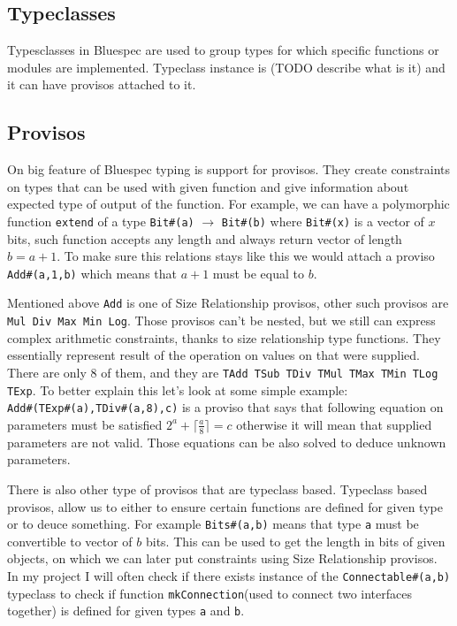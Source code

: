 \documentclass[14pt]{report}
\begin{document}
\subsection{Typeclasses}
\label{sec:Typeclasses}
Typesclasses in Bluespec are used to group types for which specific functions or modules are implemented. Typeclass instance is (TODO describe what is it) and it can have provisos attached to it.

\subsection{Provisos}
\label{sec:Provisos}
On big feature of Bluespec typing is support for provisos. They create constraints on types that can be used with given function and give information about expected type of output of the function. For example, we can have a polymorphic function \verb!extend! of a type \verb!Bit#(a)! $\rightarrow$ \verb!Bit#(b)! where \verb!Bit#(x)! is a vector of $x$ bits, such function accepts any length and always return vector of length $b=a+1$. To make sure this relations stays like this we would attach a proviso \verb!Add#(a,1,b)! which means that $a+1$ must be equal to $b$. 
\par
Mentioned above \verb!Add! is one of Size Relationship provisos, other such provisos are \verb!Mul Div Max Min Log!.
Those provisos can't be nested, but we still can express complex arithmetic constraints, thanks to size relationship type functions.
They essentially represent result of the operation on values on that were supplied. There are only 8 of them, and they are \verb!TAdd TSub TDiv TMul TMax TMin TLog TExp!.
To better explain this let's look at some simple example: \\
\verb!Add#(TExp#(a),TDiv#(a,8),c)! is a proviso that says that following equation on parameters must be satisfied $2^a+\lceil\frac{a}{8}\rceil = c$ otherwise it will mean that supplied parameters are not valid. Those equations can be also solved to deduce unknown parameters.
\par
There is also other type of provisos that are typeclass based.
Typeclass based provisos, allow us to either to ensure certain functions are defined for given type or to deuce something. For example \verb!Bits#(a,b)! means that type \verb!a! must be convertible to vector of $b$ bits. This can be used to get the length in bits of given objects, on which we can later put constraints using Size Relationship provisos.
\\
In my project I will often check if there exists instance of the \verb!Connectable#(a,b)! typeclass to check if function \verb!mkConnection!(used to connect two interfaces together) is defined for given types \verb!a! and \verb!b!.
\end{document}
